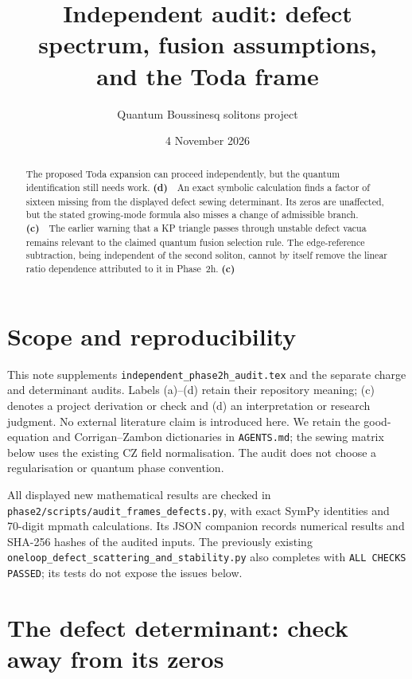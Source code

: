 \documentclass[11pt,a4paper]{article}
\title{Independent audit: defect spectrum, fusion assumptions,\\and the Toda frame}
\author{Quantum Boussinesq solitons project}
\date{4 November 2026}
\newcommand{\Lc}{\textsf{\textbf{(c)}}\ }
\newcommand{\Ld}{\textsf{\textbf{(d)}}\ }
\newcommand{\scr}{\texttt{audit\_\allowbreak frames\_\allowbreak defects.py}}
\begin{document}
\maketitle
\begin{abstract}
The proposed Toda expansion can proceed independently, but the quantum
identification still needs work. \Ld\ An exact symbolic calculation finds a
factor of sixteen missing from the displayed defect sewing determinant.
Its zeros are unaffected, but the stated growing-mode formula also misses a
change of admissible branch. \Lc\ The earlier warning that a KP triangle
passes through unstable defect vacua remains relevant to the claimed quantum
fusion selection rule. The edge-reference subtraction, being independent of
the second soliton, cannot by itself remove the linear ratio dependence
attributed to it in Phase~2h. \Lc
\end{abstract}

\section{Scope and reproducibility}
This note supplements \texttt{independent\_phase2h\_audit.tex} and the separate
charge and determinant audits. Labels (a)--(d) retain their repository meaning;
(c) denotes a project derivation or check and (d) an interpretation or research
judgment. No external literature claim is introduced here. We retain the
good-equation and Corrigan--Zambon dictionaries in \texttt{AGENTS.md}; the
sewing matrix below uses the existing CZ field normalisation. The audit does
not choose a regularisation or quantum phase convention.

All displayed new mathematical results are checked in
\texttt{phase2/scripts/}\scr, with exact SymPy identities and 70-digit mpmath
calculations. Its JSON companion records numerical results and SHA-256 hashes
of the audited inputs. The previously existing
\texttt{oneloop\_defect\_scattering\_and\_stability.py} also completes with
\texttt{ALL CHECKS PASSED}; its tests do not expose the issues below.

\section{The defect determinant: check away from its zeros}
\end{document}
